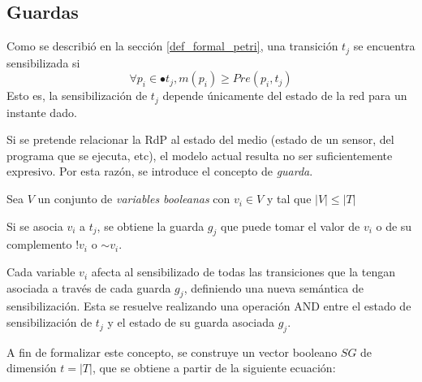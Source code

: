 \subsection{Guardas}



Como se describió en la sección \ref{def_formal_petri}, una transición $t_{j}$
se encuentra sensibilizada si $$ \forall p_{i} \in \bullet t_{j}, m(p_i) \geq Pre(p_{i}, t_{j}) $$
Esto es, la sensibilización de $t_{j}$ depende únicamente del estado de
la red para un instante dado.

Si se pretende relacionar la RdP al estado del medio (estado de un sensor, del
programa que se ejecuta, etc), el modelo actual resulta no ser suficientemente
expresivo. Por esta razón, se introduce el concepto de \textit{guarda}.

Sea $V$ un conjunto de \textit{variables booleanas} con $v_{i} \in V$ y tal que
$\left\vert V \right\vert \leq \left\vert T \right\vert$

Si se asocia $v_{i}$ a $t_{j}$, se obtiene la guarda $g_{j}$ que puede tomar el
valor de $v_{i}$ o de su complemento $!v_{i}$ o $\mathtt{\sim} v_{i}$.

Cada variable $v_{i}$ afecta al sensibilizado de todas las transiciones que la
tengan asociada a través de cada guarda $g_{j}$, definiendo una nueva semántica
de sensibilización. Esta se resuelve realizando una operación AND entre el
estado de sensibilización de $t_{j}$ y el estado de su guarda asociada $g_{j}$.

A fin de formalizar este concepto, se construye un vector booleano $SG$ de
dimensión $t = \left\vert{T}\right\vert$, que se obtiene a partir de la
siguiente ecuación:

